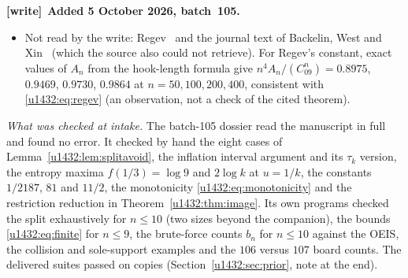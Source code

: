 \documentclass[11pt]{article}
\theoremstyle{remark}\newtheorem{remark}[theorem]{Remark}
\newenvironment{writenote}[1][]{\par\smallskip\begingroup\small
 \noindent\textbf{[write]}\if\relax\detokenize{#1}\relax\else~\textbf{#1.}\fi\ }%
 {\par\endgroup\smallskip}
\begin{document}
\begin{writenote}[Added 5 October 2026, batch~105]
\begin{itemize}
 the NE and SE chain statistics). The write located them and did not
 re-derive them. Burstein~\cite{Burstein} (three pages) is the short proof
 of Noonan's count of permutations with one $321$; located.
\item Not read by the write: Regev~\cite{Regev} and the journal text of
 Backelin, West and Xin~\cite{BWX} (which the source also could not
 retrieve). For Regev's constant, exact values of $A_n$ from the hook-length
 formula give $n^4A_n/(C_09^n)=0.8975$, $0.9469$, $0.9730$, $0.9864$ at
 $n=50,100,200,400$, consistent with \eqref{u1432:eq:regev} (an observation,
 not a check of the cited theorem).
\end{itemize}

\emph{What was checked at intake.} The batch-105 dossier read the manuscript
in full and found no error. It checked by hand the eight cases of
Lemma~\ref{u1432:lem:splitavoid}, the inflation interval argument and its
$\tau_k$ version, the entropy maxima $f(1/3)=\log9$ and $2\log k$ at $u=1/k$,
the constants $1/2187$, $81$ and $11/2$, the monotonicity
\eqref{u1432:eq:monotonicity} and the restriction reduction in
Theorem~\ref{u1432:thm:image}. Its own programs checked the split
exhaustively for $n\le10$ (two sizes beyond the companion), the bounds
\eqref{u1432:eq:finite} for $n\le9$, the brute-force counts $b_n$ for
$n\le10$ against the OEIS, the collision and sole-support examples and the
$106$ versus $107$ board counts. The delivered suites passed on copies
(Section~\ref{u1432:sec:prior}, note at the end).


\end{writenote}
\end{document}
